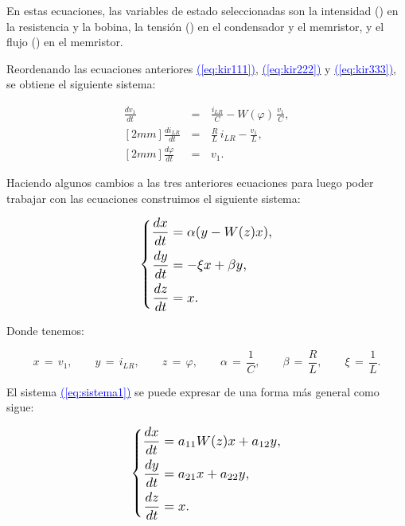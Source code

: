 \documentclass[12pt,a4paper]{report} %
\newcommand{\eref}[1]{\hyperref[#1]{\textcolor{blue}{(\ref*{#1})}}}
\newcommand{\eref}[1]{\hyperref[#1]{\textcolor{blue}{\textit{(\ref*{#1})}}}}
\begin{document}
		\vspace{0.5cm}\noindent En estas ecuaciones, las variables de estado seleccionadas son la intensidad () en la resistencia y la bobina, la tensión () en el condensador y el memristor, y el flujo (\bm{$\varphi$}) en el memristor.
	
	\vspace{0.5cm}\noindent Reordenando las ecuaciones anteriores \eref{eq:kir111}, \eref{eq:kir222} y \eref{eq:kir333}, se obtiene el siguiente sistema:
	
	\begin{eqnarray}
		\frac{dv_1}{dt}\,&=&\,\frac{i_{LR}}{C}-W(\varphi)\,\frac{v_1}{C} \label{eq:sis1}, \\ [2mm]
		\frac{di_{LR}}{dt}\,&=&\,\frac{R}{L}\,i_{LR}-\frac{v_1}{L} \label{eq:sis2}, \\ [2mm]
		\frac{d\varphi}{dt}\,&=&\,v_1. \label{eq:sis3}
	\end{eqnarray}\smallskip
	
	\vspace{0.5cm}\noindent Haciendo algunos cambios a las tres anteriores ecuaciones para luego poder trabajar con las ecuaciones construimos el siguiente sistema:
    
	\vspace{0.5cm}\begin{equation}
		\label{eq:sistema1}
		\scalebox{1.2}{$\displaystyle
			\left\{
			\begin{aligned}
				\frac{dx}{dt} &= \alpha (y - W(z)x), \\
				\frac{dy}{dt} &= -\xi x + \beta y, \\
				\frac{dz}{dt} &= x.
			\end{aligned}
			\right.
			$}
	\end{equation}\smallskip
	
	\noindent Donde tenemos:
	
	\begin{equation*}
		x\,=\,v_1, \qquad y\,=\,i_{LR}, \qquad z\,=\,\varphi, \qquad \alpha\,=\,\frac{1}{C}, \qquad \beta\,=\,\frac{R}{L}, \qquad \xi\,=\,\frac{1}{L}.
	\end{equation*}
	
	\newpage
	
	El sistema \eref{eq:sistema1} se puede expresar de una forma más general como sigue:
	
	\begin{equation}
		\label{eq:sistema}
		\scalebox{1.2}{$\displaystyle
			\left\{
			\begin{aligned}
				\frac{dx}{dt} &= a_{11}W(z)x+a_{12}y, \\
				\frac{dy}{dt} &=  a_{21}x+ a_{22}y, \\
				\frac{dz}{dt} &= x.
			\end{aligned}
			\right.
			$}
	\end{equation}\smallskip
	
\end{document}
